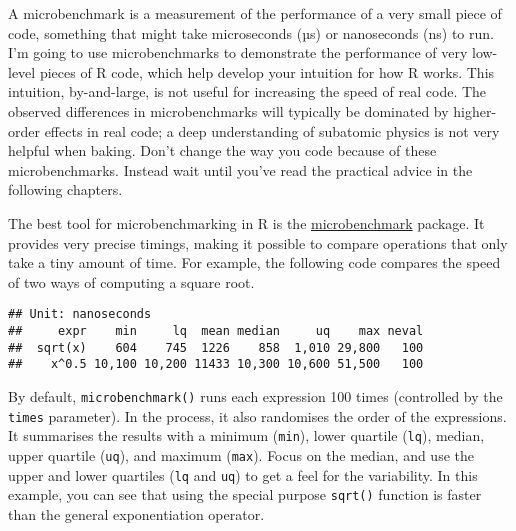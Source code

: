 A microbenchmark is a measurement of the performance of a very small
piece of code, something that might take microseconds (µs) or
nanoseconds (ns) to run. I'm going to use microbenchmarks to demonstrate
the performance of very low-level pieces of R code, which help develop
your intuition for how R works. This intuition, by-and-large, is not
useful for increasing the speed of real code. The observed differences
in microbenchmarks will typically be dominated by higher-order effects
in real code; a deep understanding of subatomic physics is not very
helpful when baking. Don't change the way you code because of these
microbenchmarks. Instead wait until you've read the practical advice in
the following chapters. 

The best tool for microbenchmarking in R is the
\href{http://cran.r-project.org/web/packages/microbenchmark/}{microbenchmark}
package. It provides very precise timings, making it possible to compare
operations that only take a tiny amount of time. For example, the
following code compares the speed of two ways of computing a square
root.

\begin{Shaded}
\begin{Highlighting}[]

\StringTok{ }\NormalTok{(}\NormalTok{)}
\NormalTok{(}
\OperatorTok{^}\StringTok{ }
\NormalTok{)}
\end{Highlighting}
\end{Shaded}

\begin{verbatim}
## Unit: nanoseconds
##     expr    min     lq  mean median     uq    max neval
##  sqrt(x)    604    745  1226    858  1,010 29,800   100
##    x^0.5 10,100 10,200 11433 10,300 10,600 51,500   100
\end{verbatim}

By default, \texttt{microbenchmark()} runs each expression 100 times
(controlled by the \texttt{times} parameter). In the process, it also
randomises the order of the expressions. It summarises the results with
a minimum (\texttt{min}), lower quartile (\texttt{lq}), median, upper
quartile (\texttt{uq}), and maximum (\texttt{max}). Focus on the median,
and use the upper and lower quartiles (\texttt{lq} and \texttt{uq}) to
get a feel for the variability. In this example, you can see that using
the special purpose \texttt{sqrt()} function is faster than the general
exponentiation operator.


